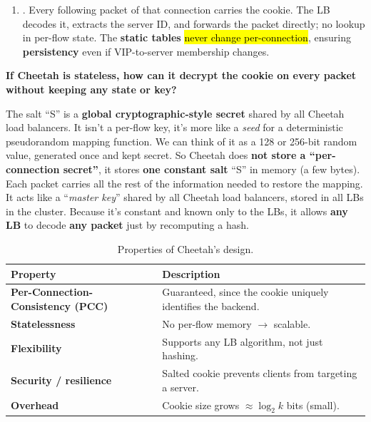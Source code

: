 \begin{enumerate}
    \item {}. Every following packet of that connection carries the cookie. The LB decodes it, extracts the server ID, and forwards the packet directly; no lookup in per-flow state. The \textbf{static tables} \hl{never change per-connection}, ensuring \textbf{persistency} even if VIP-to-server membership changes.
\end{enumerate}

\highspace
\begin{flushleft}
    \textcolor{Green3}{ \textbf{If Cheetah is stateless, how can it decrypt the cookie on every packet without keeping any state or key?}}
\end{flushleft}
The salt ``S'' is a \textbf{global cryptographic-style secret} shared by all Cheetah load balancers. It isn't a per-flow key, it's more like a \emph{seed} for a deterministic pseudorandom mapping function. We can think of it as a 128 or 256-bit random value, generated once and kept secret. So Cheetah does \textbf{not store a ``per-connection secret''}, it stores \textbf{one constant salt} ``S'' in memory (a few bytes). Each packet carries all the rest of the information needed to restore the mapping. It acts like a ``\emph{master key}'' shared by all Cheetah load balancers, stored in all LBs in the cluster. Because it's constant and known only to the LBs, it allows \textbf{any LB} to decode \textbf{any packet} just by recomputing a hash.

\begin{table}[!htp]
    \centering
    \begin{tabular}{@{} l p{15em} @{}}
        \toprule
        \textbf{Property} & \textbf{Description} \\
        \midrule
        \textbf{Per-Connection-Consistency (PCC)}   & Guaranteed, since the cookie uniquely identifies the backend. \\[.5em]
        \textbf{Statelessness}                      & No per-flow memory $\to$ scalable.                            \\[.5em]
        \textbf{Flexibility}                        & Supports any LB algorithm, not just hashing.                  \\[.5em]
        \textbf{Security / resilience}              & Salted cookie prevents clients from targeting a server.       \\[.5em]
        \textbf{Overhead}                           & Cookie size grows $\approx\log_{2} k$ bits (small).           \\
        \bottomrule
    \end{tabular}
    \caption{Properties of Cheetah's design.}
\end{table}

